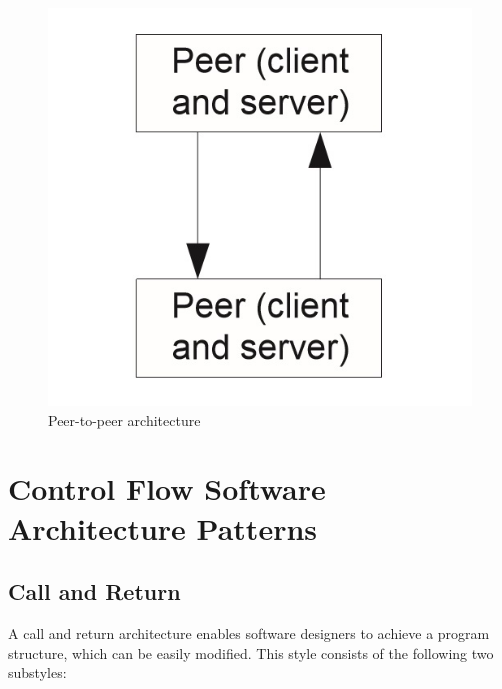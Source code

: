 \documentclass{article}
\begin{document}
\begin{figure}[h]
\centering
\includegraphics[scale=0.5]{p2p.jpg}
\caption{Peer-to-peer architecture}
\label{fig_mbr}
\end{figure}
\newpage


\section{Control Flow Software Architecture Patterns}
\subsection{Call and Return}
A call and return architecture enables software designers to achieve a program structure, which can be easily modified. This style consists of the following two substyles: \\
\end{document}
